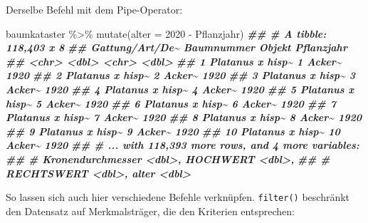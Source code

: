 \documentclass[11pt,german,a4paper]{article}
\newenvironment{Shaded}{\begin{snugshade}}{\end{snugshade}}
\newcommand{\AttributeTok}[1]{\textcolor[rgb]{0.77,0.63,0.00}{#1}}
\newcommand{\DecValTok}[1]{\textcolor[rgb]{0.00,0.00,0.81}{#1}}
\newcommand{\DocumentationTok}[1]{\textcolor[rgb]{0.56,0.35,0.01}{\textbf{\textit{#1}}}}
\newcommand{\FunctionTok}[1]{\textcolor[rgb]{0.00,0.00,0.00}{#1}}
\newcommand{\NormalTok}[1]{#1}
\newcommand{\SpecialCharTok}[1]{\textcolor[rgb]{0.00,0.00,0.00}{#1}}
\begin{document}
Derselbe Befehl mit dem Pipe-Operator:

\begin{Shaded}
\begin{Highlighting}[]
\NormalTok{baumkataster }\SpecialCharTok{\%\textgreater{}\%}
  \FunctionTok{mutate}\NormalTok{(}\AttributeTok{alter =} \DecValTok{2020} \SpecialCharTok{{-}}\NormalTok{ Pflanzjahr)}
\DocumentationTok{\#\# \# A tibble: 118,403 x 8}
\DocumentationTok{\#\#    \textasciigrave{}Gattung/Art/De\textasciitilde{} Baumnummer Objekt Pflanzjahr}
\DocumentationTok{\#\#    \textless{}chr\textgreater{}                 \textless{}dbl\textgreater{} \textless{}chr\textgreater{}       \textless{}dbl\textgreater{}}
\DocumentationTok{\#\#  1 Platanus x hisp\textasciitilde{}          1 Acker\textasciitilde{}       1920}
\DocumentationTok{\#\#  2 Platanus x hisp\textasciitilde{}          2 Acker\textasciitilde{}       1920}
\DocumentationTok{\#\#  3 Platanus x hisp\textasciitilde{}          3 Acker\textasciitilde{}       1920}
\DocumentationTok{\#\#  4 Platanus x hisp\textasciitilde{}          4 Acker\textasciitilde{}       1920}
\DocumentationTok{\#\#  5 Platanus x hisp\textasciitilde{}          5 Acker\textasciitilde{}       1920}
\DocumentationTok{\#\#  6 Platanus x hisp\textasciitilde{}          6 Acker\textasciitilde{}       1920}
\DocumentationTok{\#\#  7 Platanus x hisp\textasciitilde{}          7 Acker\textasciitilde{}       1920}
\DocumentationTok{\#\#  8 Platanus x hisp\textasciitilde{}          8 Acker\textasciitilde{}       1920}
\DocumentationTok{\#\#  9 Platanus x hisp\textasciitilde{}          9 Acker\textasciitilde{}       1920}
\DocumentationTok{\#\# 10 Platanus x hisp\textasciitilde{}         10 Acker\textasciitilde{}       1920}
\DocumentationTok{\#\# \# ... with 118,393 more rows, and 4 more variables:}
\DocumentationTok{\#\# \#   Kronendurchmesser \textless{}dbl\textgreater{}, HOCHWERT \textless{}dbl\textgreater{},}
\DocumentationTok{\#\# \#   RECHTSWERT \textless{}dbl\textgreater{}, alter \textless{}dbl\textgreater{}}
\end{Highlighting}
\end{Shaded}

So lassen sich auch hier verschiedene Befehle verknüpfen. \texttt{filter()} beschränkt den Datensatz auf Merkmalsträger, die den Kriterien entsprechen:
\end{document}
